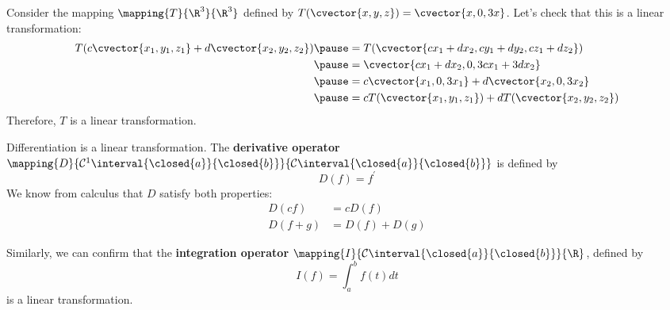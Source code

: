 \documentclass{beamer}
\begin{document}
\begin{frame}
\begin{example}
Consider the mapping $\mapping{T}{\R^3}{\R^3}$ defined by $T(\cvector{x,y,z})=\cvector{x,0,3x}$. Let's check that this is a linear transformation:\pause
\begin{equation*}
\begin{aligned}
T(c\cvector{x_1, y_1, z_1}+d\cvector{x_2, y_2, z_2})\pause
&=T(\cvector{c x_1 + d x_2, c y_1 + d y_2 , c z_1 + d z_2})\\\pause
&=\cvector{c x_1 + d x_2, 0, 3 c x_1 + 3 d x_2}\\\pause
&=c\cvector{x_1, 0 , 3 x_1}+d\cvector{x_2, 0, 3 x_2}\\\pause
&=cT(\cvector{x_1, y_1, z_1})+dT(\cvector{x_2, y_2, z_2})
\end{aligned}
\end{equation*}\pause
Therefore, $T$ is a linear transformation.
\end{example}
\end{frame}

\begin{frame}
\begin{example}
Differentiation is a linear transformation. The \textbf{derivative operator} $\mapping{D}{\mathcal{C}^1\interval{\closed{a}}{\closed{b}}}{\mathcal{C}\interval{\closed{a}}{\closed{b}}}$ is defined by
\begin{equation*}
D(f)=f^{\prime}
\end{equation*}\pause
We know from calculus that $D$ satisfy both properties:
\begin{equation*}
\begin{aligned}
D(cf) &= cD(f)\\
D(f+g) &= D(f)+D(g)
\end{aligned}
\end{equation*}
\end{example}\pause

\begin{example}
Similarly, we can confirm that the \textbf{integration operator} $\mapping{I}{\mathcal{C}\interval{\closed{a}}{\closed{b}}}{\R}$, defined by
\begin{equation*}
I(f)=\int_a^b f(t) dt
\end{equation*}
is a linear transformation.
\end{example}
\end{frame}
\end{document}

